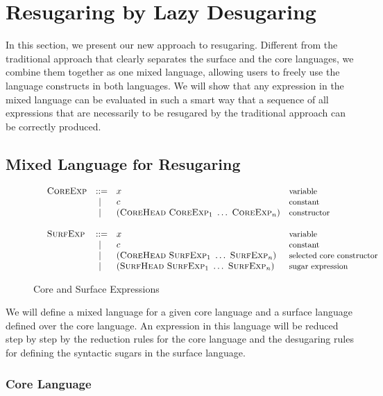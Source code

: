 
\section{Resugaring by Lazy Desugaring}
\label{sec3}

In this section, we present our new approach to resugaring. Different from the traditional approach that clearly separates the surface and the core languages, we combine them together as one mixed language, allowing users to freely use the language constructs in both languages. We will show that any expression in the mixed language can be evaluated in such a smart way that a sequence of all expressions that are necessarily to be resugared by the traditional approach can be correctly produced.

\subsection{Mixed Language for Resugaring}

\begin{figure}[t]
	\[
	\begin{array}{lllll}
	 &\mbox{\sc CoreExp} &::=& x  & \mbox{{\small variable}}\\
	       &&~|~& c  & \mbox{{\small constant}}\\
				 &&~|~& (\mbox{\sc CoreHead}~\mbox{\sc CoreExp}_1~\ldots~\mbox{\sc CoreExp}_n) & \mbox{{\small constructor}}\\
	\\
	 &\mbox{\sc SurfExp} &::=& x  & \mbox{{\small variable}}\\
	       &&~|~& c  & \mbox{{\small constant}}\\
				 &&~|~& (\mbox{\sc CoreHead}~\mbox{\sc SurfExp}_1~\ldots~\mbox{\sc SurfExp}_n) & \mbox{{\small selected core constructor}}\\
					 &&~|~& (\mbox{\sc SurfHead}~\mbox{\sc SurfExp}_1~\ldots~\mbox{\sc SurfExp}_n) & \mbox{{\small sugar expression}}\\
	\end{array}
	\]
	\caption{Core and Surface Expressions}
	\label{fig:expression}
\end{figure}

We will define a mixed language for a given core language and a surface language defined over the core language. An expression in this language will be reduced step by step by the reduction rules for the core language and the desugaring rules for defining the syntactic sugars in the surface language.

\subsubsection{Core Language}

